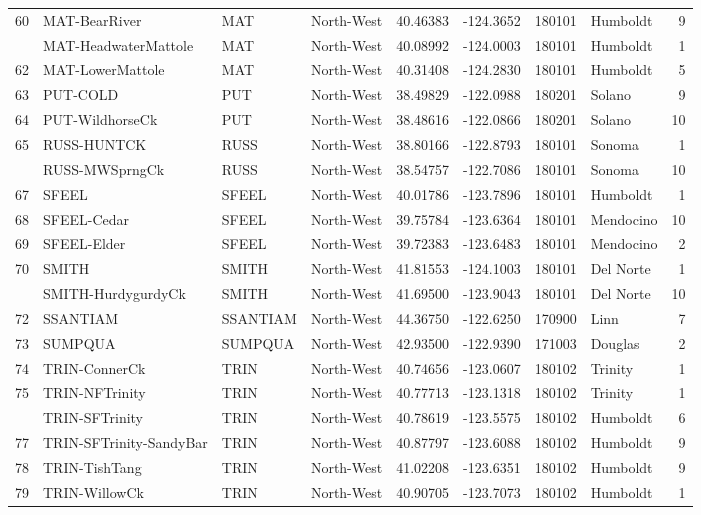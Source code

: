 \documentclass[proquest,12pt,final]{ucthesis-CA2012} %
\begin{document}
\begin{ucmainmatter}
\begin{longtable}[t]{rlllrrrlr}
60 & MAT-BearRiver & MAT & North-West & 40.46383 & -124.3652 & 180101 & Humboldt & 9\\
\addlinespace
61 & MAT-HeadwaterMattole & MAT & North-West & 40.08992 & -124.0003 & 180101 & Humboldt & 1\\
62 & MAT-LowerMattole & MAT & North-West & 40.31408 & -124.2830 & 180101 & Humboldt & 5\\
63 & PUT-COLD & PUT & North-West & 38.49829 & -122.0988 & 180201 & Solano & 9\\
64 & PUT-WildhorseCk & PUT & North-West & 38.48616 & -122.0866 & 180201 & Solano & 10\\
65 & RUSS-HUNTCK & RUSS & North-West & 38.80166 & -122.8793 & 180101 & Sonoma & 1\\
\addlinespace
66 & RUSS-MWSprngCk & RUSS & North-West & 38.54757 & -122.7086 & 180101 & Sonoma & 10\\
67 & SFEEL & SFEEL & North-West & 40.01786 & -123.7896 & 180101 & Humboldt & 1\\
68 & SFEEL-Cedar & SFEEL & North-West & 39.75784 & -123.6364 & 180101 & Mendocino & 10\\
69 & SFEEL-Elder & SFEEL & North-West & 39.72383 & -123.6483 & 180101 & Mendocino & 2\\
70 & SMITH & SMITH & North-West & 41.81553 & -124.1003 & 180101 & Del Norte & 1\\
\addlinespace
71 & SMITH-HurdygurdyCk & SMITH & North-West & 41.69500 & -123.9043 & 180101 & Del Norte & 10\\
72 & SSANTIAM & SSANTIAM & North-West & 44.36750 & -122.6250 & 170900 & Linn & 7\\
73 & SUMPQUA & SUMPQUA & North-West & 42.93500 & -122.9390 & 171003 & Douglas & 2\\
74 & TRIN-ConnerCk & TRIN & North-West & 40.74656 & -123.0607 & 180102 & Trinity & 1\\
75 & TRIN-NFTrinity & TRIN & North-West & 40.77713 & -123.1318 & 180102 & Trinity & 1\\
\addlinespace
76 & TRIN-SFTrinity & TRIN & North-West & 40.78619 & -123.5575 & 180102 & Humboldt & 6\\
77 & TRIN-SFTrinity-SandyBar & TRIN & North-West & 40.87797 & -123.6088 & 180102 & Humboldt & 9\\
78 & TRIN-TishTang & TRIN & North-West & 41.02208 & -123.6351 & 180102 & Humboldt & 9\\
79 & TRIN-WillowCk & TRIN & North-West & 40.90705 & -123.7073 & 180102 & Humboldt & 1\\

\end{longtable}
\end{ucmainmatter}
\end{document}
